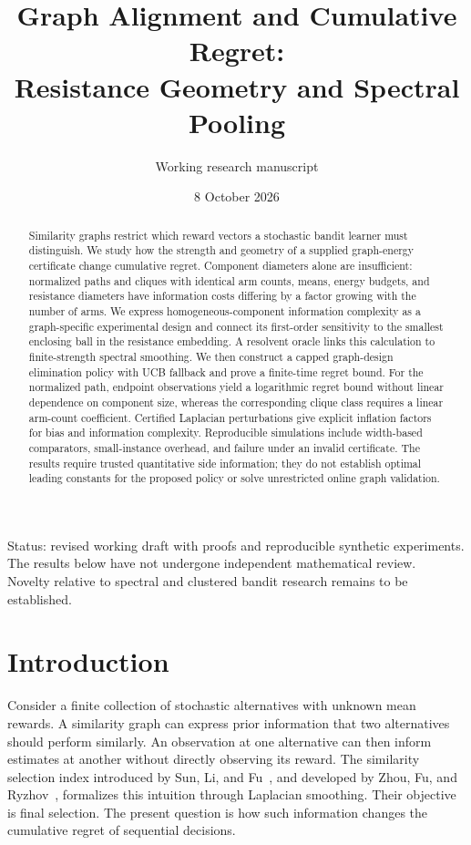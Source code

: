 \documentclass[11pt]{article}
\title{Graph Alignment and Cumulative Regret:\\Resistance Geometry and Spectral Pooling}
\author{Working research manuscript}
\date{8 October 2026}
\begin{document}
\maketitle
\begin{center}\small
Status: revised working draft with proofs and reproducible synthetic experiments.\\
The results below have not undergone independent mathematical review.\\
Novelty relative to spectral and clustered bandit research remains to be established.
\end{center}

\begin{abstract}
Similarity graphs restrict which reward vectors a stochastic bandit learner must distinguish. We study how the strength and geometry of a supplied graph-energy certificate change cumulative regret. Component diameters alone are insufficient: normalized paths and cliques with identical arm counts, means, energy budgets, and resistance diameters have information costs differing by a factor growing with the number of arms. We express homogeneous-component information complexity as a graph-specific experimental design and connect its first-order sensitivity to the smallest enclosing ball in the resistance embedding. A resolvent oracle links this calculation to finite-strength spectral smoothing. We then construct a capped graph-design elimination policy with UCB fallback and prove a finite-time regret bound. For the normalized path, endpoint observations yield a logarithmic regret bound without linear dependence on component size, whereas the corresponding clique class requires a linear arm-count coefficient. Certified Laplacian perturbations give explicit inflation factors for bias and information complexity. Reproducible simulations include width-based comparators, small-instance overhead, and failure under an invalid certificate. The results require trusted quantitative side information; they do not establish optimal leading constants for the proposed policy or solve unrestricted online graph validation.
\end{abstract}

\section{Introduction}
Consider a finite collection of stochastic alternatives with unknown mean rewards. A similarity graph can express prior information that two alternatives should perform similarly. An observation at one alternative can then inform estimates at another without directly observing its reward. The similarity selection index introduced by Sun, Li, and Fu~\cite{sun2019}, and developed by Zhou, Fu, and Ryzhov~\cite{zhou2024}, formalizes this intuition through Laplacian smoothing. Their objective is final selection. The present question is how such information changes the cumulative regret of sequential decisions.
\end{document}
